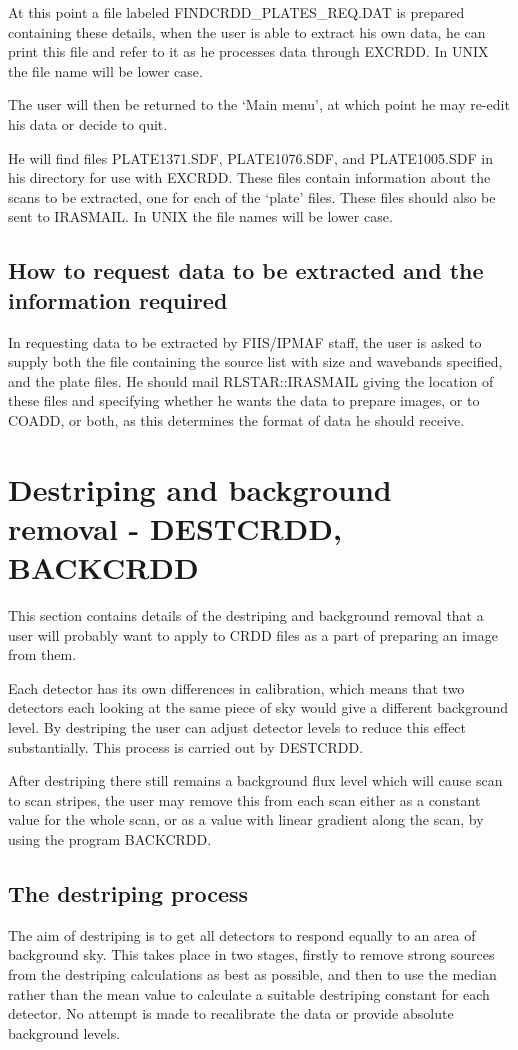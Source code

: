 \documentclass[twoside,11pt]{starlink}
\begin{document}
At this point a file labeled FINDCRDD\_PLATES\_REQ.DAT is prepared containing
these details, when the user is able to extract his own data, he can print
this file and refer to it as he processes data through EXCRDD. In UNIX the file
name will be lower case.

The user will then be returned to the `Main menu', at which point he may re-edit
his data or decide to quit.

He will find files PLATE1371.SDF, PLATE1076.SDF, and PLATE1005.SDF in his
directory for use with EXCRDD. These files contain information about the scans
to be extracted, one for each of the `plate' files. These files should also be
sent to IRASMAIL. In UNIX the file names will be lower case.
\subsection{How to request data to be extracted and the information required}
\label{m:exinfo}
In requesting data to be extracted by FIIS/IPMAF staff, the user is asked to
supply both the file containing the source list with size and wavebands
specified, and the plate files. He should mail RLSTAR::IRASMAIL giving the
location of these files and specifying  whether he wants the data to prepare
images, or to COADD, or both, as this determines the format of data he should
receive.

\section{Destriping and background removal - DESTCRDD, BACKCRDD
\label{m:destback}}

This section contains details of the destriping and background removal that a
user will probably want to apply to CRDD files as a part of preparing an image
from them.

Each detector has its own differences in calibration, which means that
two detectors each looking at the same piece of sky would give a different
background level. By destriping the user can adjust detector levels to reduce
this effect substantially. This process is carried out by DESTCRDD.

After destriping there  still remains a background flux level which will cause
scan to scan stripes, the user may remove this from each scan either as a
constant value for the whole scan, or as a value with linear gradient along the
scan, by using the program BACKCRDD.
\subsection{The destriping process}
The aim of destriping is to get all detectors to respond equally to an area of
background sky. This takes place in two stages, firstly to remove strong sources
from the destriping calculations as best as possible, and then to use the median
rather than the mean value to calculate a suitable destriping constant for each
detector. No attempt is made to recalibrate the data or provide absolute
background levels.
\end{document}
